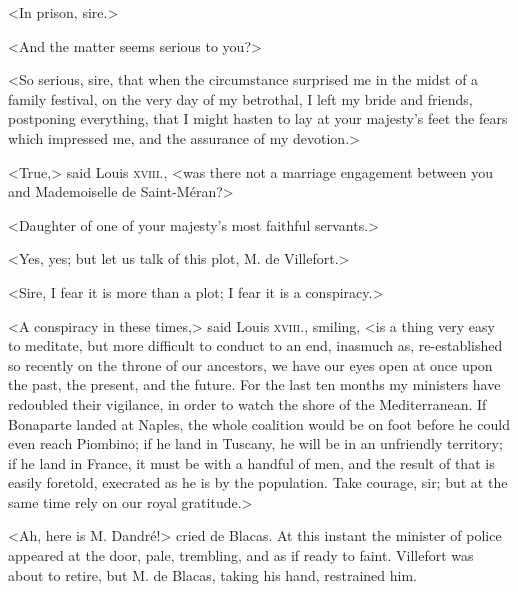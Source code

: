  <In prison, sire.> 

 <And the matter seems serious to you?> 

 <So serious, sire, that when the circumstance surprised me in the midst of a family festival, on the very day of my betrothal, I left my bride and friends, postponing everything, that I might hasten to lay at your majesty's feet the fears which impressed me, and the assurance of my devotion.> 

 <True,> said Louis \textsc{xviii.}, <was there not a marriage engagement between you and Mademoiselle de Saint-Méran?> 

 <Daughter of one of your majesty's most faithful servants.> 

 <Yes, yes; but let us talk of this plot, M. de Villefort.> 

 <Sire, I fear it is more than a plot; I fear it is a conspiracy.> 

 <A conspiracy in these times,> said Louis \textsc{xviii.}, smiling, <is a thing very easy to meditate, but more difficult to conduct to an end, inasmuch as, re-established so recently on the throne of our ancestors, we have our eyes open at once upon the past, the present, and the future. For the last ten months my ministers have redoubled their vigilance, in order to watch the shore of the Mediterranean. If Bonaparte landed at Naples, the whole coalition would be on foot before he could even reach Piombino; if he land in Tuscany, he will be in an unfriendly territory; if he land in France, it must be with a handful of men, and the result of that is easily foretold, execrated as he is by the population. Take courage, sir; but at the same time rely on our royal gratitude.> 

 <Ah, here is M. Dandré!> cried de Blacas. At this instant the minister of police appeared at the door, pale, trembling, and as if ready to faint. Villefort was about to retire, but M. de Blacas, taking his hand, restrained him. 